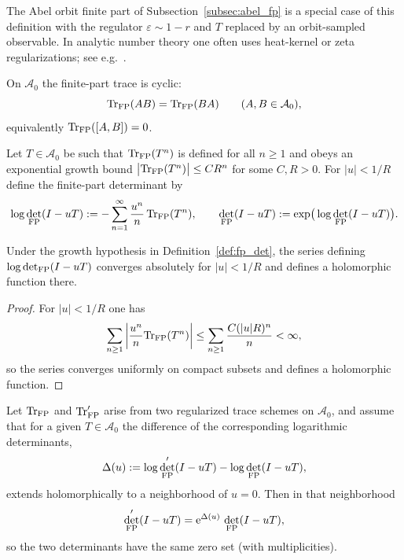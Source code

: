 \begin{remark}
The Abel orbit finite part of Subsection~\ref{subsec:abel_fp} is a special case of this definition with the regulator $\varepsilon\sim 1-r$ and $T$ replaced by an orbit-sampled observable. In analytic number theory one often uses heat-kernel or zeta regularizations; see e.g.~\cite{Connes1994,Hardy1949}.
\end{remark}

\begin{assumption}
\label{ass:fp_cyclicity}
On $\mathcal{A}_0$ the finite-part trace is cyclic:
$$
\mathrm{Tr}_{\mathrm{FP}}(AB)=\mathrm{Tr}_{\mathrm{FP}}(BA)\qquad (A,B\in\mathcal{A}_0),
$$
equivalently $\mathrm{Tr}_{\mathrm{FP}}([A,B])=0$.
\end{assumption}

\begin{definition}
\label{def:fp_det}
Let $T\in\mathcal{A}_0$ be such that $\mathrm{Tr}_{\mathrm{FP}}(T^n)$ is defined for all $n\ge 1$ and obeys an exponential growth bound $\big|\mathrm{Tr}_{\mathrm{FP}}(T^n)\big|\le C R^n$ for some $C,R>0$. For $|u|<1/R$ define the finite-part determinant by
$$
\log\det_{\mathrm{FP}}(I-uT):=-\sum_{n=1}^{\infty}\frac{u^n}{n}\,\mathrm{Tr}_{\mathrm{FP}}(T^n),
\qquad
\det_{\mathrm{FP}}(I-uT):=\exp\!\big(\log\det_{\mathrm{FP}}(I-uT)\big).
$$
\end{definition}

\begin{proposition}
\label{prop:fp_det_analytic}
Under the growth hypothesis in Definition~\ref{def:fp_det}, the series defining $\log\det_{\mathrm{FP}}(I-uT)$ converges absolutely for $|u|<1/R$ and defines a holomorphic function there.
\end{proposition}

\begin{proof}
For $|u|<1/R$ one has
$$
\sum_{n\ge 1}\left|\frac{u^n}{n}\mathrm{Tr}_{\mathrm{FP}}(T^n)\right|
\le \sum_{n\ge 1}\frac{C(|u|R)^n}{n}
<\infty,
$$
so the series converges uniformly on compact subsets and defines a holomorphic function.
\end{proof}

\begin{proposition}
\label{prop:fp_det_invariance}
Let $\mathrm{Tr}_{\mathrm{FP}}$ and $\mathrm{Tr}'_{\mathrm{FP}}$ arise from two regularized trace schemes on $\mathcal{A}_0$, and assume that for a given $T\in\mathcal{A}_0$ the difference of the corresponding logarithmic determinants,
$$
\Delta(u):=\log\det'_{\mathrm{FP}}(I-uT)-\log\det_{\mathrm{FP}}(I-uT),
$$
extends holomorphically to a neighborhood of $u=0$. Then in that neighborhood
$$
\det'_{\mathrm{FP}}(I-uT)=\mathrm{e}^{\Delta(u)}\,\det_{\mathrm{FP}}(I-uT),
$$
so the two determinants have the same zero set (with multiplicities).
\end{proposition}

